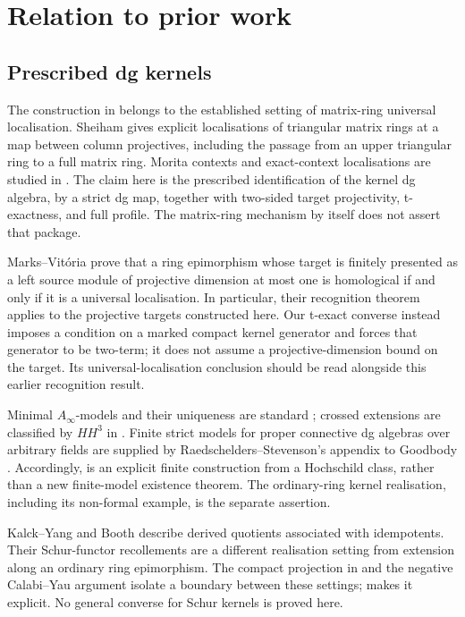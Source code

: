 \section{Relation to prior work}\label{sec:literature}

\subsection{Prescribed dg kernels}
The construction in  belongs to the established setting of matrix-ring universal localisation. Sheiham \cite[Theorem~2.4 and Example~2.5(1)]{Sheiham06} gives explicit localisations of triangular matrix rings at a map between column projectives, including the passage from an upper triangular ring to a full matrix ring. Morita contexts and exact-context localisations are studied in \cite{GreenPsaroudakis14,GaoPsaroudakis17,ChenXiRecollI,ChenXi19}. The claim here is the prescribed identification of the kernel dg algebra, by a strict dg map, together with two-sided target projectivity, t-exactness, and full profile. The matrix-ring mechanism by itself does not assert that package.

Marks--Vit\'oria \cite[Theorem~3.3]{MarksVitoria15} prove that a ring epimorphism whose target is finitely presented as a left source module of projective dimension at most one is homological if and only if it is a universal localisation. In particular, their recognition theorem applies to the projective targets constructed here. Our t-exact converse instead imposes a condition on a marked compact kernel generator and forces that generator to be two-term; it does not assume a projective-dimension bound on the target. Its universal-localisation conclusion should be read alongside this earlier recognition result.

Minimal \(A_\infty\)-models and their uniqueness are standard \cite{Keller01Ainf,LefevreHasegawa03}; crossed extensions are classified by \(HH^3\) in \cite{BauesMinian02}. Finite strict models for proper connective dg algebras over arbitrary fields are supplied by Raedschelders--Stevenson's appendix to Goodbody \cite[Theorem~A.3]{Goodbody24}. Accordingly,  is an explicit finite construction from a Hochschild class, rather than a new finite-model existence theorem. The ordinary-ring kernel realisation, including its non-formal example, is the separate assertion.

Kalck--Yang \cite{KalckYangI,KalckYangII} and Booth \cite{Booth21} describe derived quotients associated with idempotents. Their Schur-functor recollements are a different realisation setting from extension along an ordinary ring epimorphism. The compact projection in  and the negative Calabi--Yau argument isolate a boundary between these settings;  makes it explicit. No general converse for Schur kernels is proved here.

